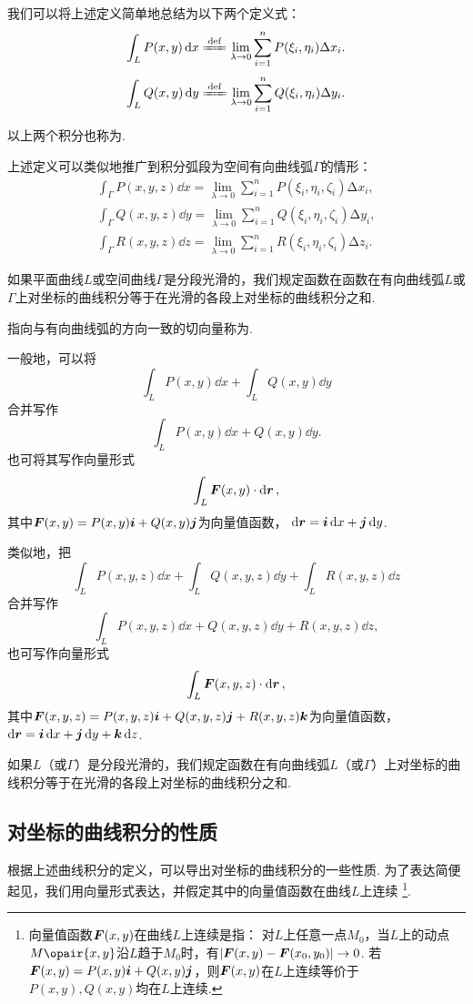 我们可以将上述定义简单地总结为以下两个定义式：
\[
\int_L P(x,y) \dd{x}
\defeq \lim\limits_{\lambda\to0}
	\sum\limits_{i=1}^n P(\xi_i,\eta_i) \increment x_i.
\]\[
\int_L Q(x,y) \dd{y}
\defeq \lim\limits_{\lambda\to0}
	\sum\limits_{i=1}^n Q(\xi_i,\eta_i) \increment y_i.
\]

以上两个积分也称为.

上述定义可以类似地推广到积分弧段为空间有向曲线弧\(\Gamma\)的情形：
\begingroup
\def\intgamma#1#2{\int_{\Gamma} #1(x,y,z) \dd{#2} = \lim\limits_{\lambda\to0} \sum\limits_{i=1}^n #1(\xi_i,\eta_i,\zeta_i) \increment #2_i}
\begin{gather*}
\intgamma{P}{x}, \\
\intgamma{Q}{y}, \\
\intgamma{R}{z}.
\end{gather*}
\endgroup

如果平面曲线\(L\)或空间曲线\(\Gamma\)是分段光滑的，我们规定函数在函数在有向曲线弧\(L\)或\(\Gamma\)上对坐标的曲线积分等于在光滑的各段上对坐标的曲线积分之和.

指向与有向曲线弧的方向一致的切向量称为.

一般地，可以将\[
\int_L P(x,y) \dd{x} + \int_L Q(x,y) \dd{y}
\]合并写作\[
\int_L P(x,y) \dd{x} + Q(x,y) \dd{y}.
\]也可将其写作向量形式\[
\int_L \boldsymbol{F}(x,y) \cdot \dd{\boldsymbol{r}},
\]其中\(\boldsymbol{F}(x,y) = P(x,y) \boldsymbol{i} + Q(x,y) \boldsymbol{j}\)为向量值函数，%
\(\dd{\boldsymbol{r}} = \boldsymbol{i} \dd{x} + \boldsymbol{j} \dd{y}\).

类似地，把\[
\int_L P(x,y,z) \dd{x} + \int_L Q(x,y,z) \dd{y} + \int_L R(x,y,z) \dd{z}
\]合并写作\[
\int_L P(x,y,z) \dd{x} + Q(x,y,z) \dd{y} + R(x,y,z) \dd{z},
\]也可写作向量形式\[
\int_L \boldsymbol{F}(x,y,z) \cdot \dd{\boldsymbol{r}},
\]其中\(\boldsymbol{F}(x,y,z) = P(x,y,z)\boldsymbol{i} + Q(x,y,z)\boldsymbol{j} + R(x,y,z)\boldsymbol{k}\)为向量值函数，%
\(\dd{\boldsymbol{r}} = \boldsymbol{i} \dd{x} + \boldsymbol{j} \dd{y} + \boldsymbol{k} \dd{z}\).

如果\(L\)（或\(\Gamma\)）是分段光滑的，我们规定函数在有向曲线弧\(L\)（或\(\Gamma\)）上对坐标的曲线积分等于在光滑的各段上对坐标的曲线积分之和.

\subsection{对坐标的曲线积分的性质}
根据上述曲线积分的定义，可以导出对坐标的曲线积分的一些性质.
为了表达简便起见，我们用向量形式表达，并假定其中的向量值函数在曲线\(L\)上连续%
\footnote{向量值函数\(\boldsymbol{F}(x,y)\)在曲线\(L\)上连续是指：%
对\(L\)上任意一点\(M_0\)，当\(L\)上的动点\(M\opair{x,y}\)沿\(L\)趋于\(M_0\)时，有\(\abs{\boldsymbol{F}(x,y)-\boldsymbol{F}(x_0,y_0)}\to0\).%
若\(\boldsymbol{F}(x,y)=P(x,y)\boldsymbol{i}+Q(x,y)\boldsymbol{j}\)，则\(\boldsymbol{F}(x,y)\)在\(L\)上连续等价于\(P(x,y),Q(x,y)\)均在\(L\)上连续.}.

